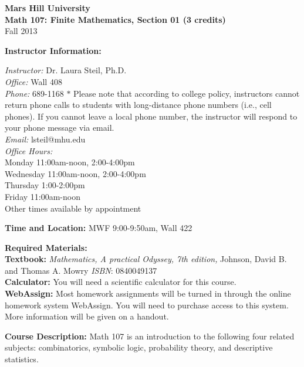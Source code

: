 \documentclass[12pt]{article}
\begin{document}
\begin{center}
\textbf{Mars Hill University}
\\
\textbf{Math 107: Finite Mathematics, Section 01 (3 credits)}
\\Fall 2013
\end{center}

\noindent\textbf{Instructor Information:}

\indent \textit{Instructor:} Dr. Laura Steil, Ph.D.
\\ \indent \textit{Office:} Wall 408
\\ \indent \textit{Phone:} 689-1168
$*$ Please note that according to college policy, instructors cannot return phone calls to students with long-distance phone numbers (i.e., cell phones).  If you cannot leave a local phone number, the instructor will respond to your phone message via email.
\\ \indent \textit{Email:} lsteil@mhu.edu
\\ \indent \textit{Office Hours:}
\\ \indent Monday 11:00am-noon, 2:00-4:00pm
\\ \indent Wednesday 11:00am-noon, 2:00-4:00pm
\\ \indent Thursday 1:00-2:00pm
\\ \indent Friday 11:00am-noon
\\ \indent Other times available by appointment

\vspace{.1 in}
\noindent\textbf{Time and Location:} MWF 9:00-9:50am,  Wall 422
\vspace{.1 in}

 \noindent\textbf{Required Materials:}
\\ \indent\textbf{Textbook:}
\textit{ Mathematics, A practical Odyssey, 7th edition, } Johnson, David B. and Thomas A. Mowry
   \textit{ISBN}: 0840049137
\noindent
\\ \indent\textbf{Calculator: }
      You will need a scientific calculator for this course.
\\ \indent\textbf{WebAssign:} Most homework assignments will be turned in through the online homework system WebAssign.  You will need to purchase access to this system.  More information will be given on a handout.
\vspace{.1 in}

 \noindent\textbf{Course Description:} Math 107 is an introduction to the following four related subjects: combinatorics, symbolic logic, probability theory, and descriptive statistics.
\vspace{.1 in}
\end{document}
